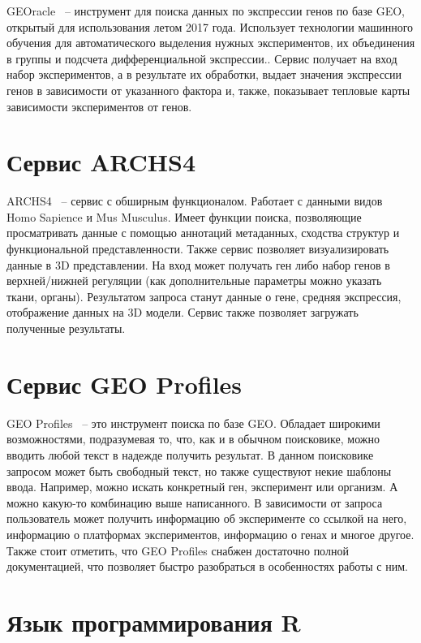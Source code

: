 \documentclass[times,specification,annotation]{itmo-student-thesis}
\begin{document}
GEOracle\cite{GEOracle} ~-- инструмент для поиска данных по экспрессии генов по базе GEO, открытый для использования летом 2017 года. Использует технологии машинного обучения для автоматического выделения нужных экспериментов, их объединения в группы и подсчета дифференциальной экспрессии.\cite{GEOracleArticle}. Сервис получает на вход набор экспериментов, а в результате их обработки, выдает значения экспрессии генов в зависимости от указанного фактора и, также, показывает тепловые карты зависимости экспериментов от генов.

\section{Сервис ARCHS4}

ARCHS4\cite{ARCHS4} ~-- сервис с обширным функционалом. Работает с данными видов Homo Sapience и Mus Musculus. Имеет функции поиска, позволяющие просматривать данные с помощью аннотаций метаданных, сходства структур и функциональной представленности.\cite{ARCHS4help} Также сервис позволяет визуализировать данные в 3D представлении. На вход может получать ген либо набор генов в верхней/нижней регуляции (как дополнительные параметры можно указать ткани, органы). Результатом запроса станут данные о гене, средняя экспрессия, отображение данных на 3D модели. Сервис также позволяет загружать полученные результаты. 

\section{Сервис GEO Profiles}

GEO Profiles\cite{GEOprofiles} ~-- это инструмент поиска по базе GEO. Обладает широкими возможностями, подразумевая то, что, как и в обычном поисковике, можно вводить любой текст в надежде получить результат. В данном поисковике запросом может быть свободный текст, но также существуют некие шаблоны ввода. Например, можно искать конкретный ген, эксперимент или организм. А можно какую-то комбинацию выше написанного. В зависимости от запроса пользователь может получить информацию об эксперименте со ссылкой на него, информацию о платформах экспериментов, информацию о генах и многое другое. Также стоит отметить, что GEO Profiles снабжен достаточно полной документацией, что позволяет быстро разобраться в особенностях работы с ним.

\section{Язык программирования R}
\end{document}
